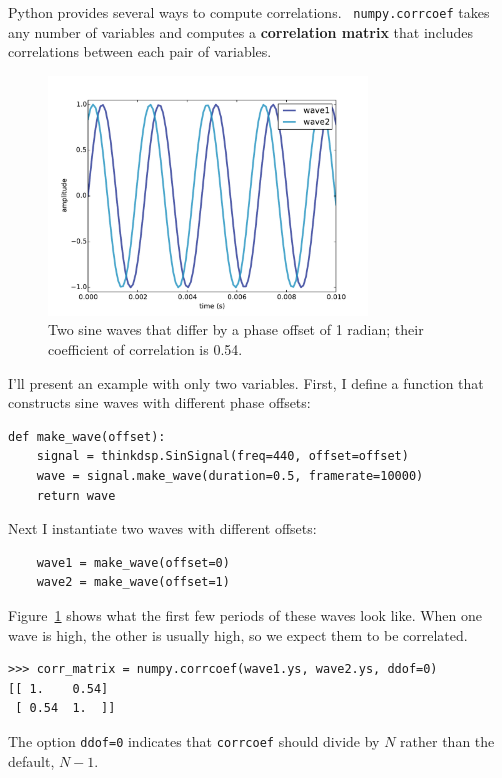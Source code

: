 \documentclass[12pt]{book}
\begin{document}
Python provides several ways to compute correlations.  {\tt
  numpy.corrcoef} takes any number of variables and computes a {\bf
  correlation matrix} that includes correlations between each pair of
variables.

\begin{figure}
\centerline{\includegraphics[height=2.5in]{figs/autocorr1.pdf}}
\caption{Two sine waves that differ by a phase offset of 1 radian;
their coefficient of correlation is 0.54.}
\label{fig.autocorr1}
\end{figure}

I'll present an example with only two variables.  First, I define
a function that constructs sine waves with different phase offsets:

\begin{verbatim}
def make_wave(offset):
    signal = thinkdsp.SinSignal(freq=440, offset=offset)
    wave = signal.make_wave(duration=0.5, framerate=10000)
    return wave
\end{verbatim}

Next I instantiate two waves with different offsets:

\begin{verbatim}
    wave1 = make_wave(offset=0)
    wave2 = make_wave(offset=1)
\end{verbatim}

Figure~\ref{fig.autocorr1} shows what the first few periods of these
waves look like.  When one wave is high, the other is usually high, so we
expect them to be correlated.

\begin{verbatim}
>>> corr_matrix = numpy.corrcoef(wave1.ys, wave2.ys, ddof=0)
[[ 1.    0.54]
 [ 0.54  1.  ]]
\end{verbatim}

The option {\tt ddof=0} indicates that {\tt corrcoef} should
divide by $N$ rather than the default, $N-1$.
\end{document}
